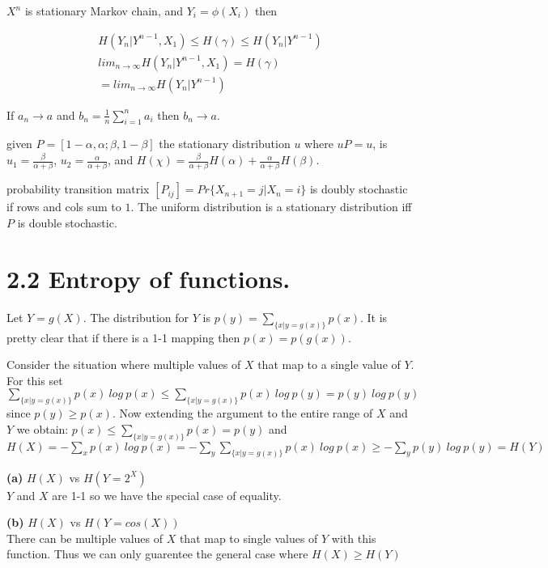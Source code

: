 \documentclass[10pt]{article}
\begin{document}
\begin{tiny}
\begin{multicols}{3}
$X^n$ is stationary Markov chain, and $Y_i = \phi(X_i)$ then

\begin{eqnarray*}
H(Y_n | Y^{n-1}, X_1) \leq H(\gamma) \leq H(Y_n|Y^{n-1})\\
lim_{n \to \infty}H(Y_n|Y^{n-1},X_1) = H(\gamma) \\
= lim_{n \to \infty} H(Y_n | Y^{n-1})
\end{eqnarray*}

 If $a_n \to a$ and $b_n = \frac{1}{n}\sum_{i=1}^n a_i$ then $b_n \to a$. 

 given $P=[1-\alpha, \alpha; \beta, 1-\beta]$ the stationary distribution $u$ where $uP = u$, is $u_1 = \frac{\beta}{\alpha+\beta}$, $u_2 = \frac{\alpha}{\alpha+\beta}$, and $H(\chi) = \frac{\beta}{\alpha + \beta}H(\alpha) + \frac{\alpha}{\alpha+\beta}H(\beta)$. 

 probability transition matrix $[P_{ij}] = Pr\{X_{n+1} = j | X_n = i\}$ is doubly stochastic if rows and cols sum to $1$. The uniform distribution is a stationary distribution iff $P$ is double stochastic.

\section* {2.2 Entropy of functions.}
Let $Y=g(X)$. The distribution for $Y$ is  $p(y)=\sum_{\{x|y=g(x)\}}p(x)$.  It is pretty clear that if there is a 1-1 mapping then $p(x)=p(g(x))$. 
                          
Consider the situation where multiple values of $X$ that map to a single value of $Y$.
For this set $\sum_{\{x|y=g(x)\}}p(x)\ log\ p(x) \leq \sum_{\{x|y=g(x)\}}p(x)\ log\ p(y) = p(y)\ log\ p(y)$ since $p(y)\geq p(x)$. Now extending the argument to the entire range of $X$ and $Y$ we obtain:
\(
p(x)\leq \sum_{\{x|y=g(x)\}}p(x)=p(y)\) and \(
H(X)=-\sum_{x}p(x)\ log\ p(x)
=-\sum_{y}\sum_{\{x|y=g(x)\}}p(x)\ log\ p(x)
\geq -\sum_{y}p(y)\ log\ p(y)
=H(Y)
\)

\textbf{(a)} $H(X)$ vs $H(Y=2^{X})$\\
$Y$ and $X$ are 1-1 so we have the special case of equality.

\textbf{(b)} $H(X)$ vs $H(Y=cos(X))$ \\
There can be multiple values of $X$ that map to single values of $Y$ with this function. Thus we can only guarentee the general case where $H(X) \geq H(Y)$


\end{multicols}
\end{tiny}
\end{document}
